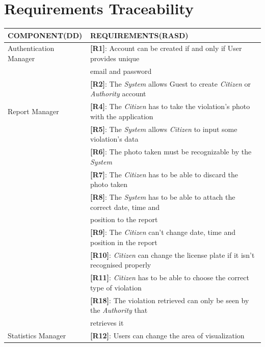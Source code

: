 \documentclass{article}
\begin{document}
\section{Requirements Traceability}
\begin{center}
    \begin{tabular}{ | l | l |}
        \hline
        COMPONENT(DD) & REQUIREMENTS(RASD) \\
        \hline
        Authentication Manager & \textbf{[R1]}: Account can be created if and only if User provides unique \\ 
                               & email and password \\
                               & \textbf{[R2]}: The \textit{System} allows Guest to create \textit{Citizen} or \textit{Authority} account \\
        \hline
        Report Manager  & \textbf{[R4]}: The \textit{Citizen} has to take the violation’s photo with the application \\
                        & \textbf{[R5]}: The \textit{System} allows \textit{Citizen} to input some violation’s data \\
                        & \textbf{[R6]}: The photo taken must be recognizable by the \textit{System} \\
                        & \textbf{[R7]}: The \textit{Citizen} has to be able to discard the photo taken \\
                        & \textbf{[R8]}: The \textit{System} has to be able to attach the correct date, time and \\ 
                        & position to the report \\
                        & \textbf{[R9]}: The \textit{Citizen} can’t change date, time and position in the report \\ 
                        & \textbf{[R10]}: \textit{Citizen} can change the license plate if it isn’t recognised properly \\
                        & \textbf{[R11]}: \textit{Citizen} has to be able to choose the correct type of violation \\
                        & \textbf{[R18]}: The violation retrieved can only be seen by the \textit{Authority} that \\
                        & retrieves it \\
        \hline
        Statistics Manager & \textbf{[R12]}: Users can change the area of visualization \\

\end{tabular}
\end{center}
\end{document}
